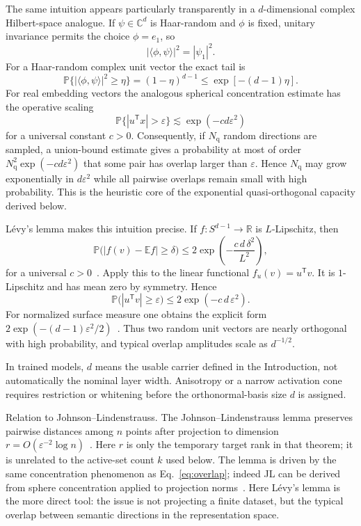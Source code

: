\documentclass[
  aps,
  reprint,
  superscriptaddress,
  floatfix,
  nofootinbib,
  longbibliography
]{revtex4-2}
\newcommand{\R}{\mathbb{R}}
\newcommand{\E}{\mathbb{E}}
\newcommand{\Prob}{\mathbb{P}}
\newcommand{\Sph}[1]{S^{#1}}
\newcommand{\Nq}{N_{\mathrm q}}
\newcommand{\T}{^{\mathsf{T}}}
\begin{document}
The same intuition appears particularly transparently in a $d$-dimensional
complex Hilbert-space analogue.  If $\psi\in\mathbb{C}^d$ is Haar-random and
$\phi$ is fixed, unitary invariance permits the choice $\phi=e_1$, so
\[
        |\langle\phi,\psi\rangle|^2=|\psi_1|^2 .
\]
For a Haar-random complex unit vector the exact tail is
\[
        \Prob\{ |\langle\phi,\psi\rangle|^2\geq\eta\}
        =(1-\eta)^{d-1}
        \leq \exp[-(d-1)\eta] .
\]
For real embedding vectors the analogous spherical concentration estimate
has the operative scaling
\[
        \Prob\{ |u\T x|>\varepsilon\}
        \lesssim \exp(-c d\varepsilon^2)
\]
for a universal constant $c>0$.  Consequently, if $\Nq$ random directions are
sampled, a union-bound estimate gives a probability at most of order
$\Nq^2\exp(-c d\varepsilon^2)$ that some pair has overlap larger than
$\varepsilon$.  Hence $\Nq$ may grow exponentially in $d\varepsilon^2$ while
all pairwise overlaps remain small with high probability.  This is the
heuristic core of the exponential quasi-orthogonal capacity derived below.

L\'evy's lemma makes this intuition precise.  If $f:\Sph{d-1}\to\R$
is $L$-Lipschitz, then
%
\begin{equation}
\label{eq:levy}
\Prob\bigl(|f(v)-\E f|\ge\delta\bigr)
 \le
2\exp\!\left(-\frac{c\,d\,\delta^{2}}{L^{2}}\right),
\end{equation}
%
for a universal $c>0$~\cite{ledoux2001concentration,milman1986asymptotic}. Apply this to the
linear functional $f_u(v)=u\T v$. It is $1$-Lipschitz and has mean zero
by symmetry. Hence
%
\begin{equation}
\label{eq:overlap}
\Prob\bigl(|u\T v|\ge\varepsilon\bigr)
 \le 2\exp(-c\,d\,\varepsilon^{2}).
\end{equation}
%
For normalized surface measure one obtains the explicit form
$2\exp(-(d-1)\varepsilon^{2}/2)$~\cite{ledoux2001concentration}. Thus two random
unit vectors are nearly orthogonal with high probability, and typical
overlap amplitudes scale as $d^{-1/2}$.

In trained models, $d$ means the usable carrier defined in the Introduction,
not automatically the nominal layer width.  Anisotropy or a narrow activation
cone requires restriction or whitening before the orthonormal-basis size $d$
is assigned.

{Relation to Johnson--Lindenstrauss.}
The Johnson--Lindenstrauss lemma preserves pairwise distances among
$n$ points after projection to dimension
$r=O(\varepsilon^{-2}\log n)$~\cite{johnson-1984}. Here $r$ is only the
temporary target rank in that theorem; it is unrelated to the active-set
count $k$ used below. The lemma is driven by the
same concentration phenomenon as Eq.~\eqref{eq:overlap}; indeed JL can
be derived from sphere concentration applied to projection
norms~\cite{Dasgupta-2003}. Here L\'evy's lemma is the more direct tool:
the issue is not projecting a finite dataset, but the typical overlap
between semantic directions in the representation space.
\end{document}

